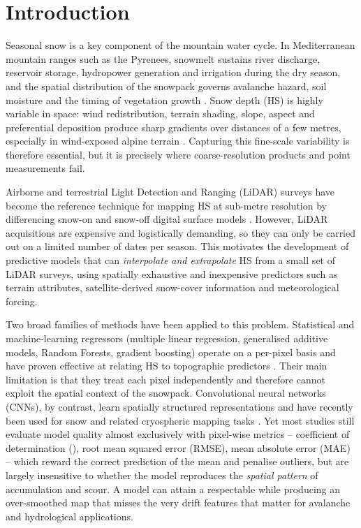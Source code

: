 \section{Introduction}
\label{sec:intro}

Seasonal snow is a key component of the mountain water cycle. In
Mediterranean mountain ranges such as the Pyrenees, snowmelt sustains river
discharge, reservoir storage, hydropower generation and irrigation during the
dry season, and the spatial distribution of the snowpack governs avalanche
hazard, soil moisture and the timing of vegetation growth
\citep{lopezmoreno2013,fayad2017}. Snow depth (HS) is highly variable in
space: wind redistribution, terrain shading, slope, aspect and preferential
deposition produce sharp gradients over distances of a few metres, especially
in wind-exposed alpine terrain \citep{mott2018,revuelto2014}. Capturing this
fine-scale variability is therefore essential, but it is precisely where
coarse-resolution products and point measurements fail.

Airborne and terrestrial Light Detection and Ranging (LiDAR) surveys have
become the reference technique for mapping HS at sub-metre resolution by
differencing snow-on and snow-off digital surface models
\citep{deems2013,painter2016}. However, LiDAR acquisitions are expensive and
logistically demanding, so they can only be carried out on a limited number of
dates per season. This motivates the development of predictive models that can
\emph{interpolate and extrapolate} HS from a small set of LiDAR surveys, using
spatially exhaustive and inexpensive predictors such as terrain attributes,
satellite-derived snow-cover information and meteorological forcing.

Two broad families of methods have been applied to this problem. Statistical
and machine-learning regressors (multiple linear regression, generalised
additive models, Random Forests, gradient boosting) operate on a per-pixel
basis and have proven effective at relating HS to topographic predictors
\citep{revuelto2014,broxton2019}. Their main limitation is that they treat
each pixel independently and therefore cannot exploit the spatial context of
the snowpack. Convolutional neural networks (CNNs), by contrast, learn
spatially structured representations and have recently been used for snow and
related cryospheric mapping tasks \citep{daudt2018,king2020}. Yet most studies
still evaluate model quality almost exclusively with pixel-wise metrics --
coefficient of determination (\Rsq{}), root mean squared error (RMSE), mean
absolute error (MAE) -- which reward the correct prediction of the mean and
penalise outliers, but are largely insensitive to whether the model reproduces
the \emph{spatial pattern} of accumulation and scour. A model can attain a
respectable \Rsq{} while producing an over-smoothed map that misses the very
drift features that matter for avalanche and hydrological applications.


